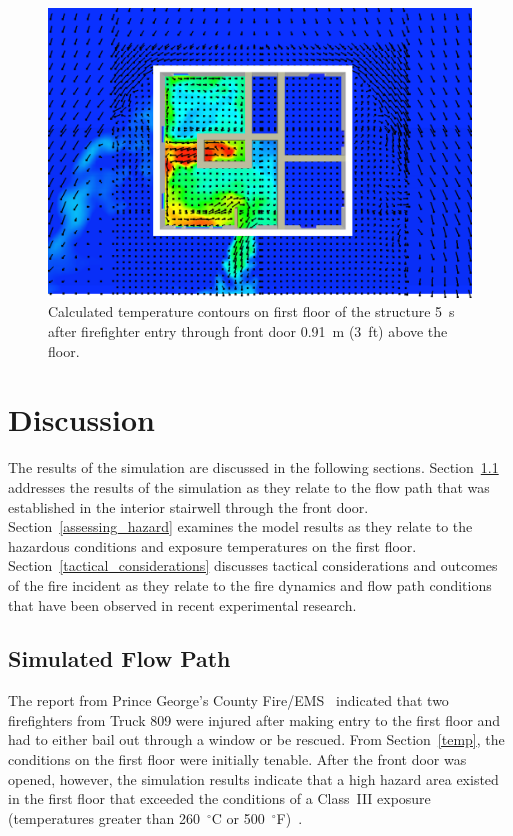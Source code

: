 \documentclass[12pt,oneside]{book}
\begin{document}
\begin{figure}[!ht]
\includegraphics[trim = 1in 1in 1in 1in, clip=true, width=.65\textwidth]{../Figures/temperature_slice_105s}


\caption[Calculated temperature on first floor 5~s after front door opens]
{Calculated temperature contours on first floor of the structure 5~s after firefighter entry through front door 0.91~m (3~ft) above the floor.}
\label{fig:temperature_slice_105s}
\end{figure}

\clearpage

\chapter{Discussion}
\label{discuss}
The results of the simulation are discussed in the following sections. Section~\ref{simulated_flow_path} addresses the results of the simulation as they relate to the flow path that was established in the interior stairwell through the front door. Section~\ref{assessing_hazard} examines the model results as they relate to the hazardous conditions and exposure temperatures on the first floor. Section~\ref{tactical_considerations} discusses tactical considerations and outcomes of the fire incident as they relate to the fire dynamics and flow path conditions that have been observed in recent experimental research.

\section{Simulated Flow Path}
\label{simulated_flow_path}

The report from Prince George's County Fire/EMS~\cite{PGCounty2013} indicated that two firefighters from Truck 809 were injured after making entry to the first floor and had to either bail out through a window or be rescued. From Section~\ref{temp}, the conditions on the first floor were initially tenable. After the front door was opened, however, the simulation results indicate that a high hazard area existed in the first floor that exceeded the conditions of a Class~III exposure (temperatures greater than 260~$^{\circ}$C or 500~$^{\circ}$F)~\cite{Donnelly2006}.
\end{document}
